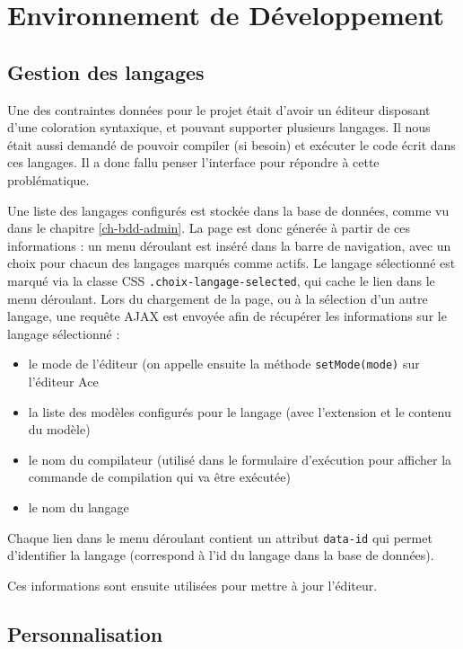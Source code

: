 \section{Environnement de Développement}

\subsection{Gestion des langages}

Une des contraintes données pour le projet était d'avoir un éditeur disposant d'une coloration syntaxique, et pouvant supporter plusieurs langages. Il nous était aussi demandé de pouvoir compiler (si besoin) et exécuter le code écrit dans ces langages. Il a donc fallu penser l'interface pour répondre à cette problématique.

Une liste des langages configurés est stockée dans la base de données, comme vu dans le chapitre \ref{ch-bdd-admin}. La page est donc génerée à partir de ces informations : un menu déroulant est inséré dans la barre de navigation, avec un choix pour chacun des langages marqués comme actifs. Le langage sélectionné est marqué via la classe CSS \texttt{.choix-langage-selected}, qui cache le lien dans le menu déroulant. Lors du chargement de la page, ou à la sélection d'un autre langage, une requête AJAX est envoyée afin de récupérer les informations sur le langage sélectionné :
\begin{itemize}
  \item le mode de l'éditeur (on appelle ensuite la méthode \texttt{setMode(mode)} sur l'éditeur Ace
  \item la liste des modèles configurés pour le langage (avec l'extension et le contenu du modèle)
  \item le nom du compilateur (utilisé dans le formulaire d'exécution pour afficher la commande de compilation qui va être exécutée)
  \item le nom du langage
\end{itemize}
Chaque lien dans le menu déroulant contient un attribut \texttt{data-id} qui permet d'identifier la langage (correspond à l'id du langage dans la base de données).

Ces informations sont ensuite utilisées pour mettre à jour l'éditeur.

\subsection{Personnalisation}

